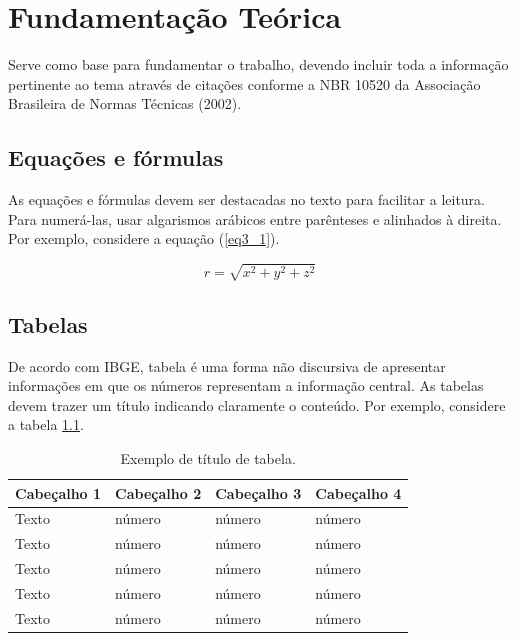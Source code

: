 \chapter{Fundamentação Teórica}\label{cap3}

Serve como base para fundamentar o trabalho, devendo incluir toda a informação pertinente ao tema através de citações  conforme a NBR 10520 da Associação Brasileira de Normas Técnicas (2002).


\section{Equações e fórmulas}

As equações e fórmulas devem ser destacadas no texto para facilitar a leitura.  Para numerá-las, usar algarismos arábicos entre parênteses e alinhados à direita. Por exemplo, considere a equação (\ref{eq3_1}).

\begin{equation}\label{eq3_1}
	r = \sqrt{x^2 + y^2 + z^2}
\end{equation}

\section{Tabelas}

De acordo com IBGE, tabela é uma forma não discursiva de apresentar informações em que os números representam a informação central. As tabelas devem trazer um título indicando claramente o conteúdo. Por exemplo, considere a tabela \ref{tab:C3_1}.

\begin{table}[htbp]
	\centering
	\caption{Exemplo de título de tabela.}
	\begin{tabular}{p{1in} p{1in} p{1in} p{1in} } \hline
		Cabeçalho 1	& Cabeçalho 2	& Cabeçalho 3	& Cabeçalho 4 \\ \hline
		Texto	& número & número	& número \\ 
		Texto	& número & número	& número \\ 
		Texto	& número & número	& número \\ 
		Texto	& número & número	& número \\ 
		Texto	& número & número	& número \\ \hline
	\end{tabular}
	\label{tab:C3_1}
\end{table}


